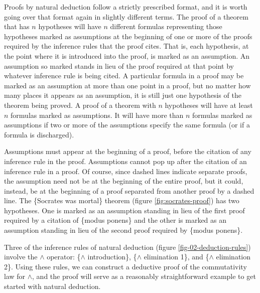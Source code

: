 Proofs by natural deduction follow a strictly prescribed format,
and it is worth going over that format again in slightly different terms.
The proof of a theorem that has
$n$ hypotheses will have $n$ different
formulas representing those hypotheses
marked as assumptions
at the beginning of one or more of the proofs
required by the inference rules that the proof cites.
That is, each hypothesis, at the point where it is introduced
into the proof, is marked as an assumption.
An assumption so marked stands in lieu of the proof
required at that point by whatever inference rule is being cited.
A particular formula in a proof may be marked as an assumption
at more than one point in a proof, but no matter how many places
it appears as an assumption, it is still just
one hypothesis of the theorem being proved.
A proof of a theorem with $n$ hypotheses will have at least $n$
formulas marked as assumptions.
It will have more than $n$ formulas marked as assumptions
if two or more of the assumptions specify the same formula
(or if a formula is discharged).

Assumptions must appear at the beginning of
a proof, before the citation of any
inference rule in the proof.
Assumptions cannot pop up after the citation
of an inference rule in a proof.
Of course, since dashed
lines indicate separate proofs,
the assumption need not be at the beginning of the entire
proof, but it could, instead, be at the beginning of
a proof separated from another proof by a dashed line.
The \{Socrates was mortal\} theorem
(figure \ref{fig:socrates-proof})
has two hypotheses.
One is marked as an assumption standing in lieu of the first proof
required by a citation of \{modus ponens\}
and the other is marked as an assumption
standing in lieu of the second proof
required by \{modus ponens\}.

Three of the inference rules of natural deduction
(figure \ref{fig-02-deduction-rules})
involve the $\wedge$ operator:
\{$\wedge$ introduction\},
\{$\wedge$ elimination 1\}, and
\{$\wedge$ elimination 2\}.
Using these rules, we can construct a deductive proof
of the commutativity law for $\wedge$,
and the proof will serve as a reasonably straightforward
example to get started with natural deduction.

